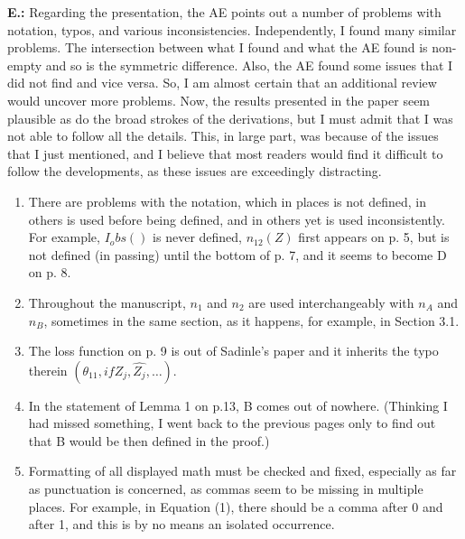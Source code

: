 \documentclass[letterpaper, parskip]{scrartcl}
\newcommand{\pointRaised}[2]{%
	\textbf{#1.\theresponsectr:} #2
}
\newcounter{responsectr}[section]     %
\begin{document}
	\pointRaised{E}{%
	Regarding the presentation, the AE points out a number of problems with notation, typos, and various inconsistencies.  Independently, I found many similar problems.  The intersection between what I found and what the AE found is non-empty and so is the symmetric difference.  Also, the AE found some issues that I did not find and vice versa.  So, I am almost certain that an additional review would uncover more problems.  Now, the results presented in the paper seem plausible as do the broad strokes of the derivations, but I must admit that I was not able to follow all the details. This, in large part, was because of the issues that I just mentioned, and I believe that most readers would find it difficult to follow the developments, as these issues are exceedingly distracting.

	\begin{enumerate}
	\item There are problems with the notation, which in places is not defined, in others is used before being defined, and in others yet is used inconsistently. For example, $I_obs()$ is never defined, $n_12(Z)$ first appears on p. 5, but is not defined (in passing) until the bottom of p. 7, and it seems to become D on p. 8.
	\item Throughout the manuscript, $n_1$ and $n_2$ are used interchangeably with $n_A$ and $n_B$, sometimes in the same section, as it happens, for example, in Section 3.1.
	\item The loss function on p. 9 is out of Sadinle’s paper and it inherits the typo therein $(\theta_11, if Z_j, \hat{Z_j}, \ldots)$.
	\item  In the statement of Lemma 1 on p.13, B comes out of nowhere.  (Thinking I had missed something, I went back to the previous pages only to find out that B would be then defined in the proof.)
	\item Formatting of all displayed math must be checked and fixed, especially as far as punctuation is concerned, as commas seem to be missing in multiple places. For example, in Equation (1), there should be a comma after 0 and after 1, and this is by no means an isolated occurrence.
	\end{enumerate}
	}
\end{document}
